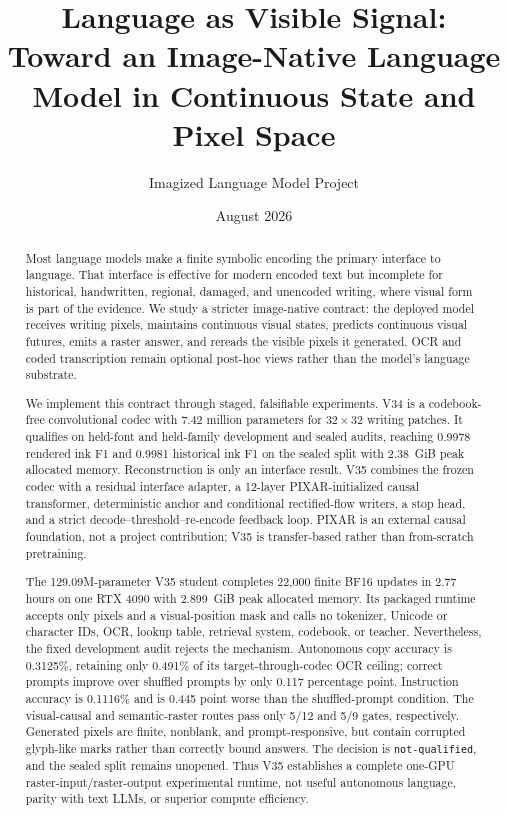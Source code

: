 \documentclass[11pt]{article}
\title{Language as Visible Signal:\\Toward an Image-Native Language Model in Continuous State and Pixel Space}
\author{Imagized Language Model Project}
\date{August 2026}
\begin{document}
\maketitle

\begin{abstract}
Most language models make a finite symbolic encoding the primary interface to
language. That interface is effective for modern encoded text but incomplete
for historical, handwritten, regional, damaged, and unencoded writing, where
visual form is part of the evidence. We study a stricter image-native contract:
the deployed model receives writing pixels, maintains continuous visual states,
predicts continuous visual futures, emits a raster answer, and rereads the
visible pixels it generated. OCR and coded transcription remain optional
post-hoc views rather than the model's language substrate.

We implement this contract through staged, falsifiable experiments. V34 is a
codebook-free convolutional codec with 7.42 million parameters for
$32\times32$ writing patches. It qualifies on held-font and held-family
development and sealed
audits, reaching 0.9978 rendered ink F1 and 0.9981 historical ink F1 on the
sealed split with 2.38~GiB peak allocated memory. Reconstruction is only an
interface result. V35 combines the frozen codec with a residual interface
adapter, a 12-layer PIXAR-initialized causal transformer, deterministic anchor
and conditional rectified-flow writers, a stop head, and a strict
decode--threshold--re-encode feedback loop. PIXAR is an external causal
foundation, not a project contribution; V35 is transfer-based rather than
from-scratch pretraining.

The 129.09M-parameter V35 student completes 22,000 finite BF16 updates in
2.77 hours on one RTX 4090 with 2.899~GiB peak allocated memory. Its packaged
runtime accepts only pixels and a visual-position mask and calls no tokenizer,
Unicode or character IDs, OCR, lookup table, retrieval system, codebook, or
teacher. Nevertheless, the fixed development audit rejects the mechanism.
Autonomous copy accuracy is 0.3125\%, retaining only 0.491\% of its
target-through-codec OCR ceiling; correct prompts improve over shuffled prompts
by only 0.117 percentage point. Instruction accuracy is 0.1116\% and is
0.445 point worse than the shuffled-prompt condition. The visual-causal and
semantic-raster routes pass only 5/12 and 5/9 gates, respectively. Generated
pixels are finite, nonblank, and prompt-responsive, but contain corrupted
glyph-like marks rather than correctly bound answers. The decision is
\texttt{not-qualified}, and the sealed split remains unopened. Thus V35
establishes a complete one-GPU raster-input/raster-output experimental runtime,
not useful autonomous language, parity with text LLMs, or superior compute
efficiency.


\end{abstract}
\end{document}
